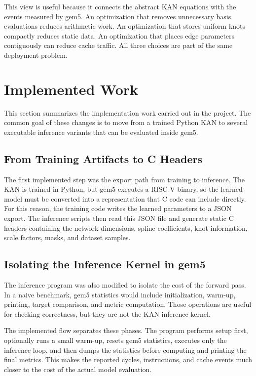 \documentclass[11pt,a4paper]{article}
\begin{document}
This view is useful because it connects the abstract KAN equations with the events measured by gem5.
An optimization that removes unnecessary basis evaluations reduces arithmetic work.
An optimization that stores uniform knots compactly reduces static data.
An optimization that places edge parameters contiguously can reduce cache traffic.
All three choices are part of the same deployment problem.

\section{Implemented Work}
\label{sec:implemented_variants_quantization}

This section summarizes the implementation work carried out in the project.
The common goal of these changes is to move from a trained Python KAN to several executable inference variants that can be evaluated inside gem5.

\subsection{From Training Artifacts to C Headers}

The first implemented step was the export path from training to inference.
The KAN is trained in Python, but gem5 executes a RISC-V binary, so the learned model must be converted into a representation that C code can include directly.
For this reason, the training code writes the learned parameters to a JSON export.
The inference scripts then read this JSON file and generate static C headers containing the network dimensions, spline coefficients, knot information, scale factors, masks, and dataset samples.

\subsection{Isolating the Inference Kernel in gem5}

The inference program was also modified to isolate the cost of the forward pass.
In a naive benchmark, gem5 statistics would include initialization, warm-up, printing, target comparison, and metric computation.
Those operations are useful for checking correctness, but they are not the KAN inference kernel.

The implemented flow separates these phases.
The program performs setup first, optionally runs a small warm-up, resets gem5 statistics, executes only the inference loop, and then dumps the statistics before computing and printing the final metrics.
This makes the reported cycles, instructions, and cache events much closer to the cost of the actual model evaluation.
\end{document}
